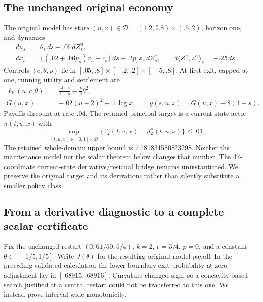\subsection{The unchanged original economy}
The original model has state $(u,x)\in\mathcal D=(1.2,2.8)\times(.5,2)$, horizon one, and dynamics
\begin{align}
 du_s&=\theta_s\,ds+.05\,dZ_s^u,\\
 dx_s&=\{(.02+.06p_s)x_s-c_s\}\,ds+.2p_sx_s\,dZ_s^x,
 \qquad d\langle Z^u,Z^x\rangle_s=-.25\,ds.
\end{align}
Controls $(c,\theta,p)$ lie in $[.05,.8]\times[-.2,.2]\times[-.5,.8]$. At first exit, capped at one, running utility and settlement are
\begin{align}
 \ell_k(u,c,\theta)&=\frac{c^{1-u}}{1-u}-\frac{k}{2}\theta^2,\\
 G(u,x)&=-.02(u-2)^2+.1\log x,\qquad
 g(s,u,x)=G(u,x)-8(1-s).
\end{align}
Payoffs discount at rate .04. The retained principal target is a current-state actor $\pi(t,u,x)$ with
\begin{equation}\label{eq:original}
 \sup_{(t,u,x)\in[0,1]\times\overline{\mathcal D}}
 \{V_2(t,u,x)-J_2^\pi(t,u,x)\}\le .01.
\end{equation}
The retained whole-domain upper bound is 7.181834580823298. Neither the maintenance model nor the scalar theorem below changes that number. The 47-coordinate current-state derivative/residual bridge remains uninstantiated. We preserve the original target and its derivations rather than silently substitute a smaller policy class.

\subsection{From a derivative diagnostic to a complete scalar certificate}
Fix the unchanged restart $(0,61/50,5/4)$, $k=2$, $c=3/4$, $p=0$, and a constant $\theta\in[-1/5,1/5]$. Write $J(\theta)$ for the resulting original-model payoff. In the preceding validated calculation the lower-boundary exit probability at zero adjustment lay in $[.68915,.68916]$. Curvature changed sign, so a concavity-based search justified at a central restart could not be transferred to this one. We instead prove interval-wide monotonicity.

